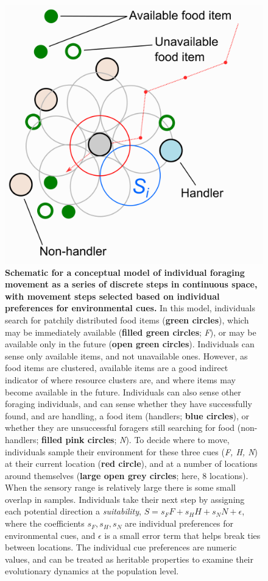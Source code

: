 \begin{figure}[!h]
    \centering
    \includegraphics[width=0.9\linewidth]{figures/introduction/fig_schematic.png}
    \caption{
        \textbf{Schematic for a conceptual model of individual foraging movement as a series of discrete steps in continuous space, with movement steps selected based on individual preferences for environmental cues.} 
        In this model, individuals search for patchily distributed food items (\textbf{green circles}), which may be immediately available (\textbf{filled green circles}; \emph{F}), or may be available only in the future (\textbf{open green circles}). 
        Individuals can sense only available items, and not unavailable ones. However, as food items are clustered, available items are a good indirect indicator of where resource clusters are, and where items may become available in the future. 
        Individuals can also sense other foraging individuals, and can sense whether they have successfully found, and are handling, a food item (handlers; \textbf{blue circles}), or whether they are unsuccessful foragers still searching for food (non-handlers; \textbf{filled pink circles}; \emph{N}). 
        To decide where to move, individuals sample their environment for these three cues (\emph{F, H, N}) at their current location (\textbf{red circle}), and at a number of locations around themselves (\textbf{large open grey circles}; here, 8 locations). 
        When the sensory range is relatively large there is some small overlap in samples. 
        Individuals take their next step by assigning each potential direction a \emph{suitability}, \(S = s_FF + s_HH + s_NN + \epsilon\), where the coefficients \(s_F, s_H, s_N\) are individual preferences for environmental cues, and \(\epsilon\) is a small error term that helps break ties between locations.
        The individual cue preferences are numeric values, and can be treated as heritable properties to examine their evolutionary dynamics at the population level.
    }
    \label{fig:compare}
  \end{figure}

